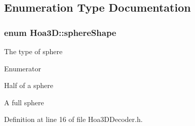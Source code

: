 \subsection{Enumeration Type Documentation}
\hypertarget{namespace_hoa3_d_a96e1558dd670aa7cddab38a58aa10c49}{
\subsubsection[{sphere\-Shape}]{\setlength{\rightskip}{0pt plus 5cm}enum {\bf Hoa3\-D\-::sphere\-Shape}}}\label{namespace_hoa3_d_a96e1558dd670aa7cddab38a58aa10c49}
The type of sphere \begin{Desc}
\item[Enumerator]\par
\begin{description}
\item[{\em 
\hypertarget{namespace_hoa3_d_a96e1558dd670aa7cddab38a58aa10c49a688ab39f396b4912d261dc7a89e7dba8}{Hoa\-\_\-\-Half\-\_\-\-Sphere}\label{namespace_hoa3_d_a96e1558dd670aa7cddab38a58aa10c49a688ab39f396b4912d261dc7a89e7dba8}
}]Half of a sphere \item[{\em 
\hypertarget{namespace_hoa3_d_a96e1558dd670aa7cddab38a58aa10c49aeb2d6c7f779a838421f9999a46a2ca22}{Hoa\-\_\-\-Full\-\_\-\-Sphere}\label{namespace_hoa3_d_a96e1558dd670aa7cddab38a58aa10c49aeb2d6c7f779a838421f9999a46a2ca22}
}]A full sphere \end{description}
\end{Desc}


Definition at line 16 of file Hoa3\-D\-Decoder.\-h.

